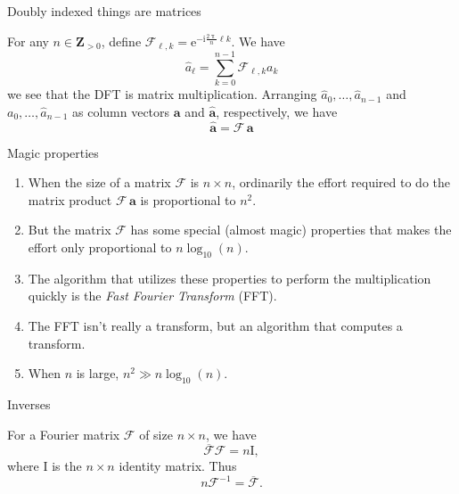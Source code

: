 \documentclass[portrait,fleqn,12pt]{beamer}
\newcommand{\integers}{\mathbf{Z}}
\newcommand{\euler}{\mathrm{e}}
\newcommand{\imag}{\mathrm{i}}
\newenvironment{handlist}
   {\begin{enumerate}[\faHandPointRight]
       \addtolength{\itemsep}{0.0\itemsep}}
     {\end{enumerate}}
\begin{document}
  \begin{frame}{Doubly indexed things are matrices}
 
 For any $n \in \integers_{>0}$, define $\mathcal{F}_{\ell, k}  = \euler^{-  \imag \frac{2 \uppi}{n}  \ell  k}$. We  have
   \begin{equation*}
      \widehat a_\ell = \sum_{k=0}^{n-1}  \mathcal{F}_{\ell, k} a_k
  \end{equation*}
  we see that the DFT is matrix multiplication. Arranging $\widehat a_0, \dots, \widehat a_{n-1}$ and  
   $a_0, \dots, \widehat a_{n-1}$ as column vectors $\mathbf{a}$ and  $\widehat{\mathbf{a}}$,  respectively, we have
    \begin{equation*}
      \widehat{\mathbf{a}}  = \mathcal{F} \, \mathbf{a}
  \end{equation*}
  
    \end{frame}
    
     \begin{frame}{Magic properties}
     
     \begin{handlist}
     \item When the size of a matrix $\mathcal{F}$ is $n\times n$, ordinarily  the effort required to do the matrix product $ \mathcal{F} \, \mathbf{a}$ is proportional to $n^2$.  
     
     \item But the matrix $\mathcal{F}$ has some special (almost magic) properties that 
     makes the effort only proportional to 
     $n \log_{10}( n)$.
     
     \item The algorithm that utilizes these properties to perform the multiplication quickly is the \emph{Fast Fourier Transform} (FFT).
     
     \item The FFT isn't really a transform, but an algorithm that computes a transform.
     
     \item When $n$ is large, $n^2 \gg n \log_{10}(n)$.
 
 \end{handlist}
  
    \end{frame}
    
  \begin{frame}{Inverses}
  
  For a Fourier matrix $\mathcal{F}$ of size $n\times n$, we have
  \begin{equation*} 
        \overline{\mathcal{F}} \mathcal{F} = n \mathrm{I},
  \end{equation*}
  where $\mathrm{I}$ is the $n \times n$ identity matrix.  Thus
      \begin{equation*} 
        n \mathcal{F}^{-1} = \overline{\mathcal{F}}.
  \end{equation*}
  
  
  \end{frame}
    
\end{document}
